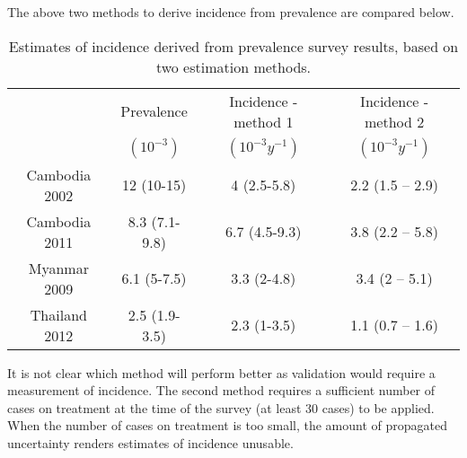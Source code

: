The above two methods to derive incidence from prevalence are compared below.

\begin{table} 
    \begin{tabular}{ c c c c }
    \hline
         & Prevalence & Incidence - method 1 & Incidence - method 2 \\ 
         & $(10^{-3})$  & $(10^{-3} y^{-1})$     & $(10^{-3} y^{-1})$ \\
    \hline
        Cambodia 2002 & 12 (10-15) & 4 (2.5-5.8) & 2.2 (1.5 – 2.9) \\ 
        Cambodia 2011 & 8.3 (7.1-9.8) & 6.7 (4.5-9.3) & 3.8 (2.2 – 5.8) \\ 
        Myanmar 2009 & 6.1 (5-7.5) & 3.3 (2-4.8) & 3.4 (2 – 5.1) \\ 
        Thailand 2012 & 2.5 (1.9-3.5) & 2.3 (1-3.5) & 1.1 (0.7 – 1.6) \\ 
    \hline
    \end{tabular} 
    \caption{Estimates of incidence derived from prevalence survey results, based on two estimation methods.} 
\end{table}

It is not clear which method will perform better as validation would require a measurement of incidence. The second method requires a sufficient number of cases on treatment at the time of the survey (at least 30 cases) to be applied. When the number of cases on treatment is too small, the amount of propagated uncertainty renders estimates of incidence unusable. 




